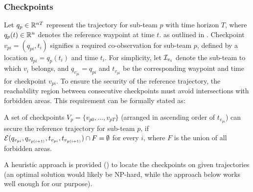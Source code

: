\documentclass[10pt,twocolumn,twoside]{IEEEtran}
\begin{document}
\subsubsection{Checkpoints}\label{sec:security-checkpoint}
Let $q_p\in\mathbb{R}^{nT}{}$ represent the trajectory for sub-team $p$ with time horizon $T$, where $q_{p}(t) \in \mathbb{R}^{n}{}$ denotes the reference waypoint at time $t$.  as outlined in . Checkpoint $v_{pi}=(q_{pi},t_{i})$ signifies a required co-observation for sub-team $p$, defined by a location $q_{pi}=q_{p}(t_i)$ and time $t_{i}$. For simplicity, let $\mathcal{I}_{v_{i}}$ denote the sub-team to which $v_{i}$ belongs, and $q_{v_{pi}} =q_{pi}$ and $t_{v_{pi}}$ be the corresponding waypoint and time for checkpoint $v_{pi}$. To ensure the security of the reference trajectory, the reachability region between consecutive checkpoints must avoid intersections with forbidden areas. This requirement can be formally stated as:


\begin{remark}
A set of checkpoints $V_{p}=\{ v_{p0}, \dots ,v_{pT}\}$ (arranged in ascending order of $t_{v_{pi}}$) can secure the reference trajectory for sub-team $p$, if $\mathcal{E}(q_{v_{pi}}, q_{v_{p(i+1)}}, t_{v_{pi}},t_{v_{p(i+1)}}) \cap F = \emptyset$ for every $i$, where $F$ is the union of all forbidden areas.
\end{remark}

A heuristic approach is provided () to locate the checkpoints on given trajectories (an optimal solution would likely be NP-hard, while the approach below works well enough for our purpose). %
\end{document}
